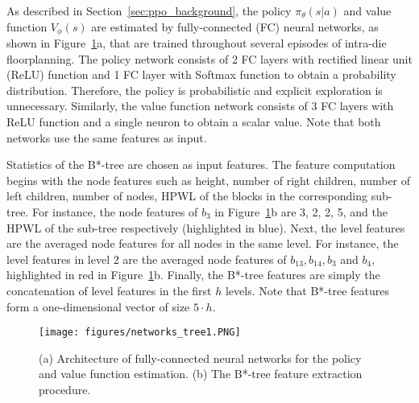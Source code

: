 As described in Section~\ref{sec:ppo_background}, the policy $\pi_\theta(s|a)$ and value function $V_\phi(s)$ are estimated by fully-connected (FC) neural networks, as shown in Figure~\ref{fig:networks}a, that are trained throughout several episodes of intra-die floorplanning. The policy network consists of 2 FC layers with rectified linear unit (ReLU) function and 1 FC layer with Softmax function to obtain a probability distribution. Therefore, the policy is probabilistic and explicit exploration is unnecessary.
Similarly, the value function network consists of 3 FC layers with ReLU function and a single neuron to obtain a scalar value. Note that both networks use the same features as input.

Statistics of the B*-tree are chosen as input features. The feature computation begins with the node features such as height, number of right children, number of left children, number of nodes, HPWL of the blocks in the corresponding sub-tree. For instance, the node features of $b_3$ in Figure~\ref{fig:networks}b are 3, 2, 2, 5, and the HPWL of the sub-tree respectively (highlighted in blue). Next, the level features are the averaged node features for all nodes in the same level. For instance, the level features in level 2 are the averaged node features of $b_{13}, b_{14}, b_3$ and $b_4$, highlighted in red in Figure~\ref{fig:networks}b. Finally, the B*-tree features are simply the concatenation of level features in the first $h$ levels. Note that B*-tree features form a one-dimensional vector of size $5\cdot h$.

\begin{figure}[ht]
\centering
\texttt{[image: figures/networks\_tree1.PNG]}
\caption{(a) Architecture of fully-connected neural networks for the policy and value function estimation. (b) The B*-tree feature extraction procedure.}
\label{fig:networks}
\vspace{-6mm}
\end{figure}
